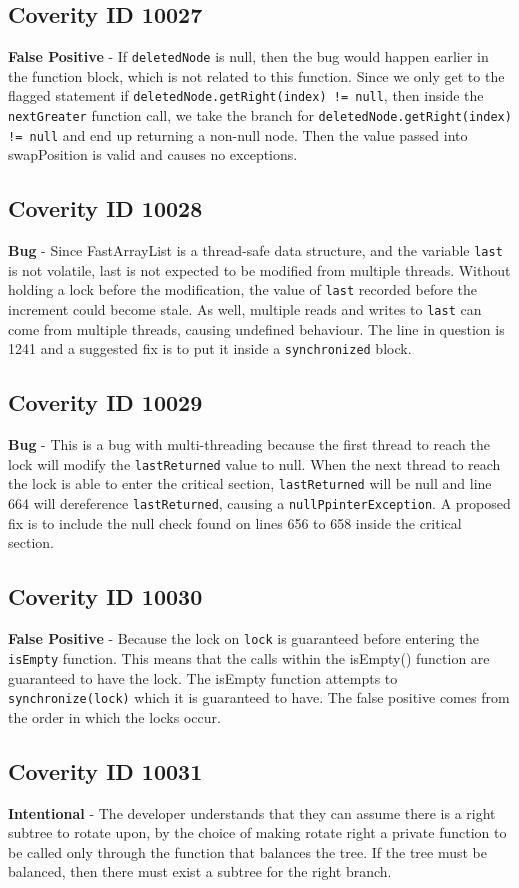 \documentclass[12pt]{article}
\begin{document}
\subsection{Coverity ID 10027}
\textbf{False Positive} - If \texttt{deletedNode} is null, then the bug would happen earlier in the function block, which is not related to this function. Since we only get to the flagged statement if \texttt{deletedNode.getRight(index) != null}, then inside the \texttt{nextGreater} function call, we take the branch for \texttt{deletedNode.getRight(index) != null} and end up returning a non-null node. Then the value passed into swapPosition is valid and causes no exceptions.
\subsection{Coverity ID 10028}
\textbf{Bug} - Since FastArrayList is a thread-safe data structure, and the variable \texttt{last} is not volatile, last is not expected to be modified from multiple threads. Without holding a lock before the modification, the value of \texttt{last} recorded before the increment could become stale. As well, multiple reads and writes to \texttt{last} can come from multiple threads, causing undefined behaviour. The line in question is 1241 and a suggested fix is to put it inside a \texttt{synchronized} block.
\subsection{Coverity ID 10029}
\textbf{Bug} - This is a bug with multi-threading because the first thread to reach the lock will modify the \texttt{lastReturned} value to null. When the next thread to reach the lock is able to enter the critical section, \texttt{lastReturned} will be null and line 664 will dereference \texttt{lastReturned}, causing a \texttt{nullPpinterException}. A proposed fix is to include the null check found on lines 656 to 658 inside the critical section.
\subsection{Coverity ID 10030}
\textbf{False Positive} - Because the lock on \texttt{lock} is guaranteed before entering the \texttt{isEmpty} function. This means that the calls within the isEmpty() function are guaranteed to have the lock. The isEmpty function attempts to \texttt{synchronize(lock)} which it is guaranteed to have. The false positive comes from the order in which the locks occur.
\subsection{Coverity ID 10031}
\textbf{Intentional} - The developer understands that they can assume there is a right subtree to rotate upon, by the choice of making rotate right a private function to be called only through the function that balances the tree. If the tree must be balanced, then there must exist a subtree for the right branch.
\end{document}
